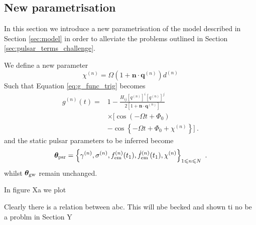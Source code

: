 \documentclass[fleqn,usenatbib,useAMS]{mnras}
\begin{document}
%
%









\subsection{New parametrisation}
In this section we introduce a new parametrisation of the model described in Section \ref{sec:model} in order to alleviate the problems outlined in Section \ref{sec:pulsar_terms_challenge}. \newline 


We define a new parameter 
\begin{equation}
\chi^{(n)} = \Omega \left( 1 + \boldsymbol{n}\cdot \boldsymbol{q}^{(n)} \right)  d^{(n)} 
\end{equation}
Such that Equation \eqref{eq:g_func_trig} becomes
\begin{align}
	g^{(n)}(t) =& 1 - \frac{ H_{ij}[q^{(n)}]^i [q^{(n)}]^j }{2 [1 + \boldsymbol{n}\cdot \boldsymbol{q}^{(n)}] } \nonumber \\
	& \times \Big[\cos\left(-\Omega t +\Phi_0\right) \nonumber \\
	&- \cos \left \{-\Omega t +\Phi_0 + \chi^{(n)} \right \} \Big ] \ .
	\label{eq:g_func_trig_chi}
\end{align}
and the static pulsar parameters to be inferred become
\begin{equation}
	\boldsymbol{\theta}_{\rm psr} = \left \{ \gamma^{(n)},\sigma^{(n)}, f_{\rm em}^{(n)}(t_1),\dot{f}_{\rm em}^{(n)}(t_1),\chi^{(n)}\right\}_{1\leq n \leq N} \ .  \label{eq:psrparams}
\end{equation}
whilst $\boldsymbol{\theta}_{\rm gw}$  remain unchanged.



In figure Xa we plot



Clearly there is a relation between abc. This will nbe becked and shown ti no be a problm in Section Y
\end{document}
